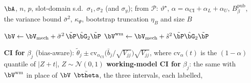 
\Require $\bA$, $n$, $p$, slot-domain s.d.\ $\sigma_1,\sigma_2$ (and $\sigma_y$); from $\mathcal P$: $\vartheta^\star$, $\alpha=\alpha_{\mathrm{CI}}+\alpha_L+\alpha_U$, $B_\beta^{\mathrm{pub}}$, the variance bound $\bar\sigma^2$, $\kappa_\Psi$, bootstrap truncation $\eta_B$ and size $B$

\State $\bV\gets\bV_{\mathrm{mech}}+\bar\sigma^2\,\tilde\bP\hat\bG_2\tilde\bP$ 
\State $\bV^{\mathrm{wm}}\gets\bV_{\mathrm{mech}}+\tilde s^2\,\tilde\bP\hat\bG_2\tilde\bP$ 

\State \textbf{CI for} $\beta_j$ (bias-aware): $\tilde\theta_j\pm\mathrm{cv}_{\alpha_{\mathrm{CI}}}\bigl(\bar b_j/\sqrt{V_{jj}}\bigr)\sqrt{V_{jj}}$, where $\mathrm{cv}_\alpha(t)$ is the $(1-\alpha)$ quantile of $|Z+t|$, $Z\sim\mathcal N(0,1)$ 
\State \textbf{working-model CI for} $\beta_j$: the same with $\bV^{\mathrm{wm}}$ in place of $\bV$ 
\State \Return $\tilde\btheta$, the three intervals, each labelled,
